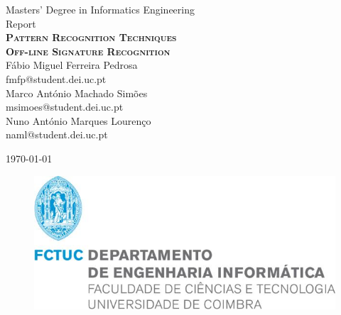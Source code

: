 \begin{titlepage}

\begin{flushleft}
\textsf{{\Large Masters' Degree in Informatics Engineering}} \\
\textsf{{\large Report}} \\[4cm]

\textsc{{\Huge \textbf{Pattern Recognition Techniques \\ Off-line Signature Recognition}}} \\[2cm]

{\large Fábio Miguel Ferreira Pedrosa} \\
fmfp@student.dei.uc.pt \\[0.5cm]
{\large Marco António Machado Simões} \\
msimoes@student.dei.uc.pt \\[0.5cm]
{\large Nuno António Marques Lourenço} \\
naml@student.dei.uc.pt \\[1cm]



\hfill

\today

\vfill

\begin{figure}[b!]
\includegraphics[width=0.6\linewidth]{pictures/fctuc}
\end{figure}

\end{flushleft}

\end{titlepage}
